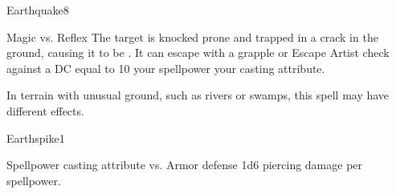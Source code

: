 \begin{spellsection}{Earthquake}{8}
    \begin{spellheader}
    \end{spellheader}
    \begin{spellcontent}
        \begin{spelltargetinginfo}
        \end{spelltargetinginfo}
        \begin{spelleffects}
            \begin{spellattack}{Magic vs. Reflex}
                \spellsuccess The target is knocked prone and trapped in a crack in the ground, causing it to be \immobilized. It can escape with a grapple or Escape Artist check against a DC equal to 10 \add your spellpower \add your casting attribute.
            \end{spellattack}
        \end{spelleffects}
    \end{spellcontent}
    \begin{spellfooter}
        \spellnotes In terrain with unusual ground, such as rivers or swamps, this spell may have different effects.

        \physicalspellnotes
        \miscastyou
    \end{spellfooter}
\end{spellsection}

\begin{spellsection}{Earthspike}{1}
    \begin{spellheader}
    \end{spellheader}
    \begin{spellcontent}
        \begin{spelltargetinginfo}
            \spellrng{\rngmed}
        \end{spelltargetinginfo}
        \begin{spelleffects}
            \begin{spellattack}{Spellpower \add casting attribute vs. Armor defense}
                \spellsuccess 1d6 piercing damage per spellpower.
            \end{spellattack}
        \end{spelleffects}
    \end{spellcontent}
    \begin{spellfooter}
        \miscastrandom
    \end{spellfooter}
\end{spellsection}

